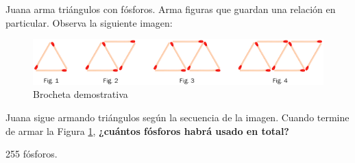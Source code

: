Juana arma triángulos con fósforos. Arma figuras que guardan una relación en particular. Observa la siguiente imagen:

\begin{minipage}{0.4\linewidth}
    \begin{figure}[H]
        \centering
        \includegraphics[width=0.9\linewidth]{../images/c9b918ae22f368bf3b8bbb644dfd20d4530338f0}
        \caption{Brocheta demostrativa}
        \label{fig:c9b918ae22f368bf3b8bbb644dfd20d4530338f0}
    \end{figure}
\end{minipage}\hfill
\begin{minipage}{0.6\linewidth}
    Juana sigue armando triángulos según la secuencia de la imagen.
    Cuando termine de armar la Figura \ref{fig:c9b918ae22f368bf3b8bbb644dfd20d4530338f0},
    \textbf{¿cuántos fósforos habrá usado en total?}

    \begin{solutionbox}{1.2cm}
        255 fósforos.
    \end{solutionbox}
\end{minipage}